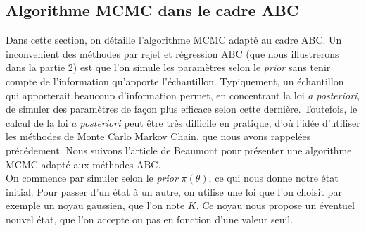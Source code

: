 \documentclass{article}
\theoremstyle{definition}
\begin{document}
\subsection{Algorithme MCMC dans le cadre ABC}

Dans cette section, on détaille l'algorithme MCMC adapté au cadre ABC. Un inconvenient des méthodes par rejet et régression ABC (que nous illustrerons dans la partie 2) est que l'on simule les paramètres selon le \textit{prior} sans tenir compte de l'information qu'apporte l'échantillon. Typiquement, un échantillon qui apporterait beaucoup d'information permet, en concentrant la loi \textit{a posteriori}, de simuler des paramètres de façon plus efficace selon cette dernière. Toutefois, le calcul de la loi \textit{a posteriori} peut être très difficile en pratique, d'où l'idée d'utiliser les méthodes de Monte Carlo Markov Chain, que nous avons rappelées précédement. Nous suivons l'article de Beaumont pour présenter une algorithme MCMC adapté aux méthodes ABC. \\

On commence par simuler selon le \textit{prior} $\pi(\theta)$, ce qui nous donne notre état initial. Pour passer d'un état à un autre, on utilise une loi que l'on choisit par exemple un noyau gaussien, que l'on note $K$. Ce noyau nous propose un éventuel nouvel état, que l'on accepte ou pas en fonction d'une valeur seuil.\\ 
\\

\\
\\
\end{document}
